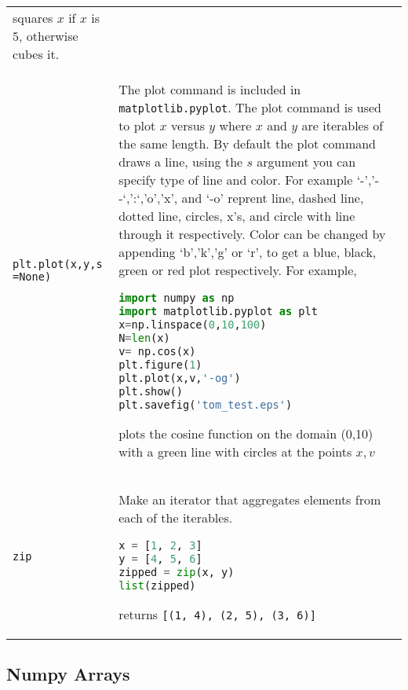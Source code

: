 \begin{tabular}[]{@{}ll@{}}
\begin{minipage}[t]{0.77\columnwidth}
squares \(x\) if \(x\) is \(5\), otherwise cubes it.\strut
\end{minipage}\tabularnewline
\begin{minipage}[t]{0.17\columnwidth}\raggedright\strut
\lstinline!plt.plot(x,y,s =None)!\strut
\end{minipage} & \begin{minipage}[t]{0.77\columnwidth}\raggedright\strut
The plot command is included in \lstinline!matplotlib.pyplot!. The plot
command is used to plot \(x\) versus \(y\) where \(x\) and \(y\) are
iterables of the same length. By default the plot command draws a line,
using the \(s\) argument you can specify type of line and color. For
example `-','- -`,':`,'o','x', and `-o' reprent line, dashed line,
dotted line, circles, x's, and circle with line through it respectively.
Color can be changed by appending `b','k','g' or `r', to get a blue,
black, green or red plot respectively. For example,

\begin{lstlisting}[language=Python]
import numpy as np
import matplotlib.pyplot as plt
x=np.linspace(0,10,100)
N=len(x)
v= np.cos(x)
plt.figure(1)
plt.plot(x,v,'-og')
plt.show()
plt.savefig('tom_test.eps')
\end{lstlisting}

plots the cosine function on the domain (0,10) with a green line with
circles at the points \(x,v\)\strut
\end{minipage}\tabularnewline
\begin{minipage}[t]{0.17\columnwidth}\raggedright\strut
\lstinline!zip!\strut
\end{minipage} & \begin{minipage}[t]{0.77\columnwidth}\raggedright\strut
Make an iterator that aggregates elements from each of the iterables.

\begin{lstlisting}[language=Python]
x = [1, 2, 3]
y = [4, 5, 6]
zipped = zip(x, y)
list(zipped)
\end{lstlisting}

returns \lstinline![(1, 4), (2, 5), (3, 6)]!\strut
\end{minipage}\tabularnewline
\bottomrule
\end{tabular}

\subsection{Numpy Arrays}\label{numpy-arrays}

